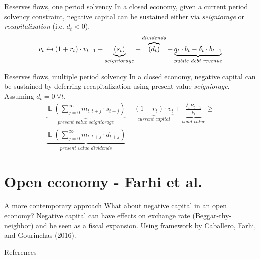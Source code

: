 \documentclass{beamer}
\newcommand{\mapsfrom}{\mathrel{\reflectbox{\ensuremath{\mapsto}}}}
\newcommand{\E}{\mathop{\mathbb{E}}}
\begin{document}
\begin{frame}{Reserves flows, one period solvency}
    In a closed economy, given a current period solvency constraint, negative capital can be sustained either via \textit{seigniorage} or \textit{recapitalization} (i.e. $d_t < 0$).
    \begin{equation}
        v_t \mapsfrom (1 + r_t) \cdot v_{t-1} - \underbrace{(s_t)}_{seigniorage} + \overbrace{(d_t)}^{dividends} + \underbrace{q_t \cdot b_t - \delta_{t} \cdot b_{t-1}}_{\textit{public debt revenue}}
    \end{equation}
\end{frame}

\begin{frame}{Reserves flows, multiple period solvency}
    In a closed economy, negative capital can be sustained by deferring recapitalization using present value \textit{seigniorage}. Assuming $d_t = 0 \ \forall t$,
    \begin{equation*}
        \begin{split}
            \underbrace{\E\left(\sum_{j=0}^\infty m_{t, t+j} \cdot s_{t+j} \right)}_{\textit{present value seigniorage}} - \underbrace{(1 + r_t) \cdot v_t}_{\textit{current capital}} + \underbrace{\frac{\delta_t B_{t-1}}{p_t}}_{\textit{bond value}} \geq \\ \underbrace{\E\left(\sum_{j=0}^\infty m_{t, t+j} \cdot d_{t+j} \right)}_{\textit{present value dividends}}
        \end{split}
    \end{equation*}
\end{frame}

\section{Open economy - Farhi et al.}

\begin{frame}{A more contemporary approach}
    What about negative capital in an open economy? \vfill
    Negative capital can have effects on exchange rate (Beggar-thy-neighbor) and be seen as a fiscal expansion. \vfill
    Using framework by Caballero, Farhi, and Gourinchas (2016).
\end{frame}


\nocite{*}

\begin{frame}[allowframebreaks]{References}
    
\end{frame}
\end{document}
